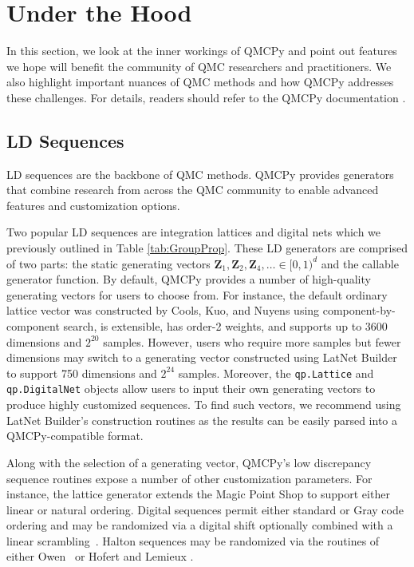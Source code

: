 \documentclass[graybox]{svmult}
\begin{document}
\section{Under the Hood}

In this section, we look at the inner workings of QMCPy and point out features we hope will benefit the community of QMC researchers and practitioners. We also highlight important nuances of QMC methods and how QMCPy addresses these challenges. For details, readers should refer to the QMCPy documentation \cite{QMCPyDocs}.

\subsection{LD Sequences}

LD sequences are the backbone of QMC methods. QMCPy provides generators that combine research from across the QMC community to enable advanced features and customization options.

Two popular LD sequences are integration lattices and digital nets which we previously outlined in Table \ref{tab:GroupProp}. These LD generators are comprised of two parts: the static generating vectors $\boldsymbol{Z}_1,\boldsymbol{Z}_2,\boldsymbol{Z}_4, \ldots \in [0,1)^d$ and the callable generator function. By default, QMCPy provides a number of high-quality generating vectors for users to choose from. For instance, the default ordinary lattice vector was constructed by Cools, Kuo, and Nuyens \cite{doi:10.1137/06065074X} using component-by-component search, is extensible, has order-2 weights, and supports up to 3600 dimensions and $2^{20}$ samples. 
However, users who require more samples but fewer dimensions may switch to a generating vector constructed using LatNet Builder \cite{LatNet,LEcEtal22a} to support 750 dimensions and $2^{24}$ samples. Moreover, the \texttt{qp.Lattice} and \texttt{qp.DigitalNet} objects allow users to input their own generating vectors to produce highly customized sequences. To find such vectors, we recommend using LatNet Builder's construction routines as the results can be easily parsed into a QMCPy-compatible format. 

Along with the selection of a generating vector, QMCPy's low discrepancy sequence routines expose a number of other customization parameters. For instance, the lattice generator extends the Magic Point Shop \cite{Nuy17a} to support either linear or natural ordering. Digital sequences permit either standard or Gray code ordering and may be randomized via a digital shift optionally combined with a linear scrambling~\cite{Mat98}. Halton sequences may be randomized via the routines of either Owen~\cite{Owe20a} or Hofert and Lemieux \cite{QRNG2020}. 
\end{document}
